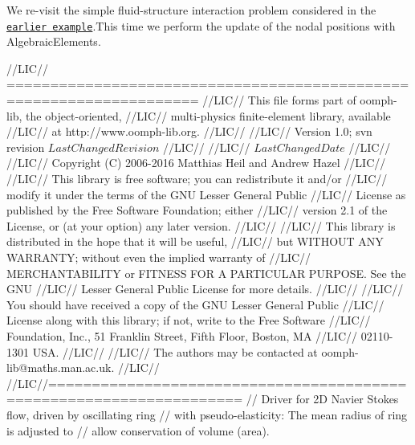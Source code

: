 We re-\/visit the simple fluid-\/structure interaction problem considered in the \href{../../osc_ring_macro/html/index.html}{\tt earlier example}.This time we perform the update of the nodal positions with {\ttfamily Algebraic\+Elements}.


\begin{DoxyCodeInclude}
\textcolor{comment}{//LIC// ====================================================================}
\textcolor{comment}{//LIC// This file forms part of oomph-lib, the object-oriented, }
\textcolor{comment}{//LIC// multi-physics finite-element library, available }
\textcolor{comment}{//LIC// at http://www.oomph-lib.org.}
\textcolor{comment}{//LIC// }
\textcolor{comment}{//LIC//    Version 1.0; svn revision $LastChangedRevision$}
\textcolor{comment}{//LIC//}
\textcolor{comment}{//LIC// $LastChangedDate$}
\textcolor{comment}{//LIC// }
\textcolor{comment}{//LIC// Copyright (C) 2006-2016 Matthias Heil and Andrew Hazel}
\textcolor{comment}{//LIC// }
\textcolor{comment}{//LIC// This library is free software; you can redistribute it and/or}
\textcolor{comment}{//LIC// modify it under the terms of the GNU Lesser General Public}
\textcolor{comment}{//LIC// License as published by the Free Software Foundation; either}
\textcolor{comment}{//LIC// version 2.1 of the License, or (at your option) any later version.}
\textcolor{comment}{//LIC// }
\textcolor{comment}{//LIC// This library is distributed in the hope that it will be useful,}
\textcolor{comment}{//LIC// but WITHOUT ANY WARRANTY; without even the implied warranty of}
\textcolor{comment}{//LIC// MERCHANTABILITY or FITNESS FOR A PARTICULAR PURPOSE.  See the GNU}
\textcolor{comment}{//LIC// Lesser General Public License for more details.}
\textcolor{comment}{//LIC// }
\textcolor{comment}{//LIC// You should have received a copy of the GNU Lesser General Public}
\textcolor{comment}{//LIC// License along with this library; if not, write to the Free Software}
\textcolor{comment}{//LIC// Foundation, Inc., 51 Franklin Street, Fifth Floor, Boston, MA}
\textcolor{comment}{//LIC// 02110-1301  USA.}
\textcolor{comment}{//LIC// }
\textcolor{comment}{//LIC// The authors may be contacted at oomph-lib@maths.man.ac.uk.}
\textcolor{comment}{//LIC// }
\textcolor{comment}{//LIC//====================================================================}
\textcolor{comment}{// Driver for 2D Navier Stokes flow, driven by oscillating ring}
\textcolor{comment}{// with pseudo-elasticity: The mean radius of ring is adjusted to}
\textcolor{comment}{// allow conservation of volume (area).}


\end{DoxyCodeInclude}
